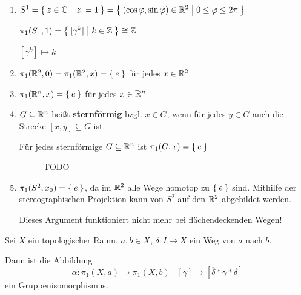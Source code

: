 \begin{beispiel}
    \begin{enumerate}[label=\arabic*)]
        \item $S^1 = \Set{z \in \ensuremath{\mathbb{C}}| |z| = 1} = \Set{(\cos \varphi, \sin \varphi) \in \ensuremath{\mathbb{R}}^2 | 0 \leq \varphi \leq 2 \pi}$

              $\pi_1 (S^1, 1) = \Set{[\gamma^k] | k \in \ensuremath{\mathbb{Z}}} \cong \mathbb{Z}$

              $[\gamma^k] \mapsto k$
        \item $\pi_1 (\mathbb{R}^2, 0) = \pi_1 (\mathbb{R}^2, x) = \Set{e}$ für jedes $x \in \mathbb{R}^2$
        \item $\pi_1 (\mathbb{R}^n, x) = \Set{e}$ für jedes $x \in \mathbb{R}^n$
        \item $G \subseteq \mathbb{R}^n$ heißt \textbf{sternförmig} bzgl. $x \in G$, 
            wenn für jedes $y \in G$ auch die Strecke $[x, y] \subseteq G$
            ist.

            Für jedes sternförmige $G \subseteq \mathbb{R}^n$ ist
            $\pi_1(G,x) = \Set{e}$


            \begin{figure}[ht]
                \centering
                \hspace{1em}%
                \label{fig:Gebiete}
                \caption{TODO}
            \end{figure}
        \item $\pi_1(S^2, x_0) = \Set{e}$, da im $\mathbb{R}^2$ alle Wege
              homotop zu $\Set{e}$ sind. Mithilfe der stereographischen
              Projektion kann von $S^2$ auf den $\mathbb{R}^2$ abgebildet
              werden.

              Dieses Argument funktioniert nicht mehr bei flächendeckenden
              Wegen!
    \end{enumerate}
\end{beispiel}

\begin{korollar}\label{kor:gruppenisomorphismus-wege}
    Sei $X$ ein topologischer Raum, $a,b \in X$, $\delta: I \rightarrow X$
    ein Weg von $a$ nach $b$.

    Dann ist die Abbildung
    \[\alpha: \pi_1 (X, a) \rightarrow \pi_1(X,b)\;\;\;[\gamma] \mapsto [\overline{\delta} * \gamma * \delta]\]
    ein Gruppenisomorphismus.
\end{korollar}

